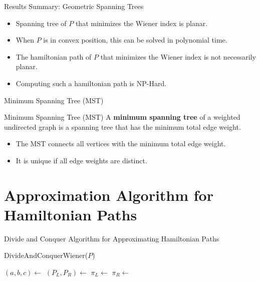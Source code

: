 \documentclass[11pt]{beamer}
\begin{document}
\begin{frame}{Results Summary: Geometric Spanning Trees}
	\begin{itemize}
		\item Spanning tree of $P$ that minimizes the Wiener index is planar.
		      \pause
		\item When $P$ is in convex position, this can be solved in polynomial time.
		      \pause
		\item The hamiltonian path of $P$ that minimizes the Wiener index is not necessarily planar.
		      \pause
		\item Computing such a hamiltonian path is NP-Hard.
	\end{itemize}
\end{frame}

\begin{frame}{Minimum Spanning Tree (MST)}
	\begin{block}{Minimum Spanning Tree (MST)}
		A \textbf{minimum spanning tree} of a weighted undirected graph is a spanning tree that has the minimum total edge weight.
		\begin{itemize}
			\item The MST connects all vertices with the minimum total edge weight.
			\item It is unique if all edge weights are distinct.
		\end{itemize}
	\end{block}
\end{frame}

\section{Approximation Algorithm for Hamiltonian Paths}

\begin{frame}{Divide and Conquer Algorithm for Approximating Hamiltonian Paths}
	\begin{algorithm}[H]
		\caption{DivideAndConquerWiener($P$)}
		\begin{algorithmic}[1]
			\State \Return {}
			\EndIf
			\State $(a, b, c) \gets$ 
			\State $(P_L, P_R) \gets$ 
			\State $\pi_L \gets$ 
			\State $\pi_R \gets$ 
			\State \Return {}
			\EndProcedure
		\end{algorithmic}
	\end{algorithm}
\end{frame}
\end{document}
